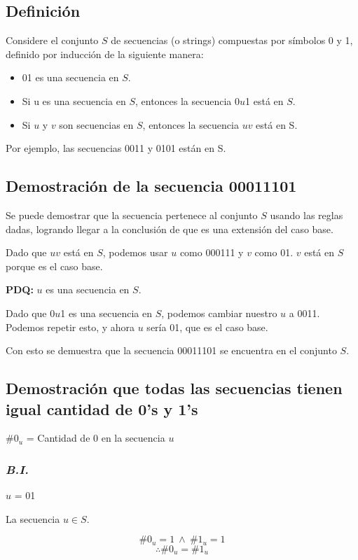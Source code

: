 \documentclass[../doc.tex]{subfiles}
\begin{document}
\subsection{Definición}
Considere el conjunto \(S\) de secuencias (o strings) compuestas por símbolos 0
y 1, definido por inducción de la siguiente manera:
\begin{itemize}
\item 01 es una secuencia en \(S\).
\item Si u es una secuencia en \(S\), entonces la secuencia 0\(u\)1 está en \(S\).
\item Si \(u\) y \(v\) son secuencias en \(S\), entonces la secuencia \(uv\) está en S.
\end{itemize}

\noindent Por ejemplo, las secuencias 0011 y 0101 están en S.

\subsection{Demostración de la secuencia 00011101}
Se puede demostrar que la secuencia pertenece al conjunto \(S\) usando las
reglas dadas, logrando llegar a la conclusión de que es una extensión del caso
base.

\noindent Dado que \(uv\) está en \(S\), podemos usar \(u\) como 000111 y \(v\)
como 01. \(v\) está en \(S\) porque es el caso base.

\textbf{PDQ:} \(u\) es una secuencia en \(S\).

\noindent Dado que 0\(u\)1 es una secuencia en \(S\), podemos cambiar nuestro
\(u\) a 0011. Podemos repetir esto, y ahora \(u\) sería 01, que es el caso
base.

\noindent Con esto se demuestra que la secuencia 00011101 se encuentra en el
conjunto \(S\).

\subsection{Demostración que todas las secuencias tienen igual cantidad de 0's y 1's}
\(\#0_u\) = Cantidad de 0 en la secuencia \(u\)

\subsubsection*{\emph{B.I.}}
\(u\) = 01

\noindent La secuencia \(u \in S\).

\[\#0_u = 1\ \land\ \#1_u = 1\]
\[\therefore \#0_u = \#1_u\]
\end{document}
